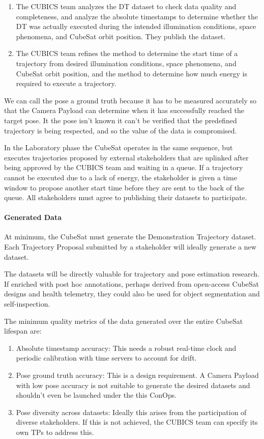 \documentclass[11pt]{article}
\begin{document}
\begin{enumerate}
\item The CUBICS team analyzes the DT dataset to check data quality and completeness, and analyze the absolute timestamps to determine whether the DT was actually executed during the intended illumination conditions, space phenomena, and CubeSat orbit position. They publish the dataset.
\item The CUBICS team refines the method to determine the start time of a trajectory from desired illumination conditions, space phenomena, and CubeSat orbit position, and the method to determine how much energy is required to execute a trajectory.
\end{enumerate}

We can call the pose a ground truth because it has to be measured accurately so that the Camera Payload can determine when it has successfully reached the target pose. It the pose isn't known it can't be verified that the predefined trajectory is being respected, and so the value of the data is compromised.

In the Laboratory phase the CubeSat operates in the same sequence, but executes trajectories proposed by external stakeholders that are uplinked after being approved by the CUBICS team and waiting in a queue.
If a trajectory cannot be executed due to a lack of energy, the stakeholder is given a time window to propose another start time before they are sent to the back of the queue.
All stakeholders must agree to publishing their datasets to participate.

\paragraph{Generated Data} At minimum, the CubeSat must generate the Demonstration Trajectory dataset.
Each Trajectory Proposal submitted by a stakeholder will ideally generate a new dataset.

The datasets will be directly valuable for trajectory and pose estimation research. If enriched with post hoc annotations, perhaps derived from open-access CubeSat designs and health telemetry, they could also be used for object segmentation and self-inspection.

The minimum quality metrics of the data generated over the entire CubeSat lifespan are:
\begin{enumerate}
\item Absolute timestamp accuracy: This needs a robust real-time clock and periodic calibration with time servers to account for drift.
\item Pose ground truth accuracy: This is a design requirement. A Camera Payload with low pose accuracy is not suitable to generate the desired datasets and shouldn't even be launched under the this ConOps.
\item Pose diversity across datasets: Ideally this arises from the participation of diverse stakeholders. If this is not achieved, the CUBICS team can specify its own TPs to address this.
\end{enumerate}
\end{document}
